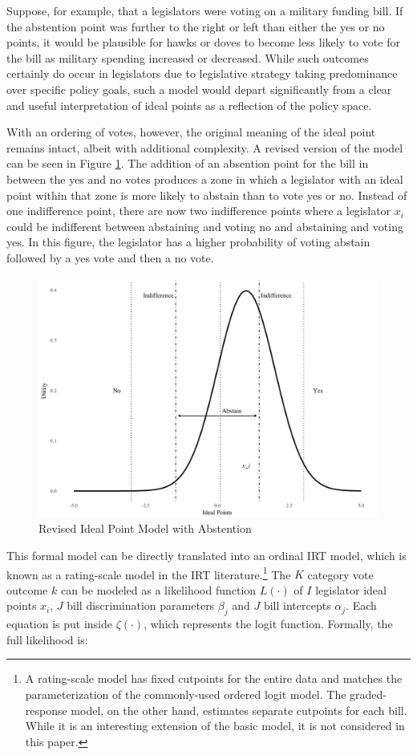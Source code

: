  	Suppose, for example, that a legislators were voting on a military funding bill. If the abstention point was further to the right or left than either the yes or no points, it would be plausible for hawks or doves to become less likely to vote for the bill as military spending increased or decreased. While such outcomes certainly do occur in legislators due to legislative strategy taking predominance over specific policy goals, such a model would depart significantly from a clear and useful interpretation of ideal points as a reflection of the policy space.
 	
 	With an ordering of votes, however, the original meaning of the ideal point remains intact, albeit with additional complexity. A revised version of the model can be seen in Figure \ref{abs_pts}. The addition of an absention point for the bill in between the yes and no votes produces a zone in which a legislator with an ideal point within that zone is more likely to abstain than to vote yes or no. Instead of one indifference point, there are now two indifference points where a legislator $x_i$ could be indifferent between abstaining and voting no and abstaining and voting yes. In this figure, the legislator has a higher probability of voting abstain followed by a yes vote and then a no vote.
 	 	\begin{figure}[h!]
 		\caption{Revised Ideal Point Model with Abstention}\label{abs_pts}
 		\includegraphics[width=0.9\linewidth]{ideal_pt_with_abstain}
 	\end{figure}
	
This formal model can be directly translated into an ordinal IRT model, which is known as a rating-scale model in the IRT literature.\footnote{A rating-scale model has fixed cutpoints for the entire data and matches the parameterization of the commonly-used ordered logit model. The graded-response model, on the other hand, estimates separate cutpoints for each bill. While it is an interesting extension of the basic model, it is not considered in this paper.} The $K$ category vote outcome $k$ can be modeled as a likelihood function $L(\cdot)$ of $I$ legislator ideal points $x_i$, $J$ bill discrimination parameters $\beta_j$ and $J$ bill intercepts $\alpha_j$. Each equation is put inside $\zeta(\cdot)$, which represents the logit function. Formally, the full likelihood is:
	
